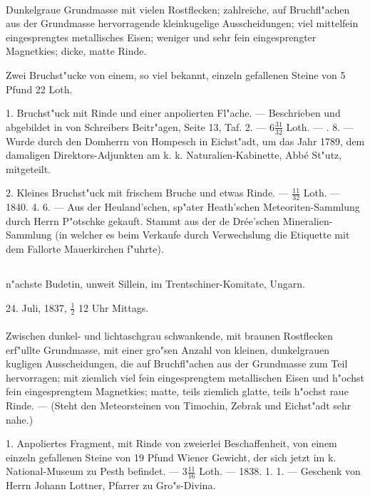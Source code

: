 \documentclass[a4paper, 11pt, oneside, polutonikogreek, german]{article}
\begin{document}
\paragraph{}
Dunkelgraue Grundmasse mit vielen Rostflecken; zahlreiche, auf Bruchfl"achen aus der Grundmasse hervorragende kleinkugelige Ausscheidungen; viel mittelfein eingesprengtes metallisches Eisen; weniger und sehr fein eingesprengter Magnetkies; dicke, matte Rinde.

Zwei Bruchst"ucke von einem, so viel bekannt, einzeln gefallenen Steine von 5 Pfund 22 Loth.

1. Bruchst"uck mit Rinde und einer anpolierten Fl"ache. --- Beschrieben und abgebildet in von Schreibers Beitr"agen, Seite 13, Taf. 2. --- $6\frac{31}{32}$ Loth. --- . 8. --- Wurde durch den Domherrn von Hompesch in Eichst"adt, um das Jahr 1789, dem damaligen Direktors-Adjunkten am k. k. Naturalien-Kabinette, Abbé St"utz, mitgeteilt.

2. Kleines Bruchst"uck mit frischem Bruche und etwas Rinde. --- $\frac{11}{32}$ Loth. --- 1840. 4. 6. --- Aus der Heuland'schen, sp"ater Heath'schen Meteoriten-Sammlung durch Herrn P"otschke gekauft. Stammt aus der de Drée'schen Mineralien-Sammlung (in welcher es beim Verkaufe durch Verwechslung die Etiquette mit dem Fallorte Mauerkirchen f"uhrte).
\subsection[\frakfamily{Gro"s-Divina.}]{}
\begin{center}

n"achste Budetin, unweit Sillein, im Trentschiner-Komitate, Ungarn.

24. Juli, 1837, $\frac{1}{2}$ 12 Uhr Mittags.
\end{center}
\paragraph{}
Zwischen dunkel- und lichtaschgrau schwankende, mit braunen Rostflecken erf"ullte Grundmasse, mit einer gro"sen Anzahl von kleinen, dunkelgrauen kugligen Ausscheidungen, die auf Bruchfl"achen aus der Grundmasse zum Teil hervorragen; mit ziemlich viel fein eingesprengtem metallischen Eisen und h"ochst fein eingesprengtem Magnetkies; matte, teils ziemlich glatte, teils h"ochst raue Rinde. --- (Steht den Meteorsteinen von Timochin, Zebrak und Eichst"adt sehr nahe.)

1. Anpoliertes Fragment, mit Rinde von zweierlei Beschaffenheit, von einem einzeln gefallenen Steine von 19 Pfund Wiener Gewicht, der sich jetzt im k. National-Museum zu Pesth befindet. --- $3\frac{11}{16}$ Loth. --- 1838. 1. 1. --- Geschenk von Herrn Johann Lottner, Pfarrer zu Gro"s-Divina.
\end{document}
